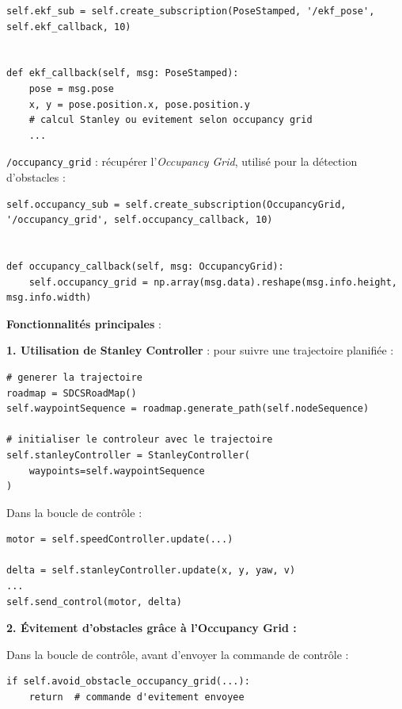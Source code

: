 \documentclass{name}
\begin{document}
\begin{lstlisting}[style=pythonstyle]
self.ekf_sub = self.create_subscription(PoseStamped, '/ekf_pose', self.ekf_callback, 10)


def ekf_callback(self, msg: PoseStamped):
    pose = msg.pose
    x, y = pose.position.x, pose.position.y
    # calcul Stanley ou evitement selon occupancy grid
    ...
\end{lstlisting}

\texttt{/occupancy\_grid} : récupérer l'\textit{Occupancy Grid}, utilisé pour la détection d'obstacles :

\begin{lstlisting}[style=pythonstyle]
self.occupancy_sub = self.create_subscription(OccupancyGrid, '/occupancy_grid', self.occupancy_callback, 10)


def occupancy_callback(self, msg: OccupancyGrid):
    self.occupancy_grid = np.array(msg.data).reshape(msg.info.height, msg.info.width)
\end{lstlisting}

\textbf{Fonctionnalités principales} :

\textbf{1. Utilisation de Stanley Controller} : pour suivre une trajectoire planifiée :

\begin{lstlisting}[style=pythonstyle]
# generer la trajectoire
roadmap = SDCSRoadMap()
self.waypointSequence = roadmap.generate_path(self.nodeSequence)

# initialiser le controleur avec le trajectoire
self.stanleyController = StanleyController(
    waypoints=self.waypointSequence
)
\end{lstlisting}

Dans la boucle de contrôle :

\begin{lstlisting}[style=pythonstyle]
motor = self.speedController.update(...)

delta = self.stanleyController.update(x, y, yaw, v)
...
self.send_control(motor, delta)
\end{lstlisting}

\textbf{2. Évitement d'obstacles grâce à l'Occupancy Grid :}

Dans la boucle de contrôle, avant d'envoyer la commande de contrôle :

\begin{lstlisting}[style=pythonstyle]
if self.avoid_obstacle_occupancy_grid(...):
    return  # commande d'evitement envoyee
\end{lstlisting}
\end{document}
